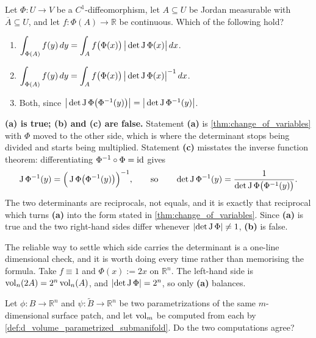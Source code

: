 \begin{question}
\label{q:quiz_q9}
Let $\Phi : U \to V$ be a $C^1$-diffeomorphism, let $A \subseteq U$ be Jordan measurable with
$\overline A \subseteq U$, and let $f : \Phi(A) \to \mathbb{R}$ be continuous. Which of the
following hold?
\begin{enumerate}[label=\textbf{(\alph*)}]
  \item $\displaystyle\int_{\Phi(A)} f(y)\,dy
    = \int_A f\big(\Phi(x)\big)\,\big\lvert\det\operatorname{J}\Phi(x)\big\rvert\,dx$.
  \item $\displaystyle\int_{\Phi(A)} f(y)\,dy
    = \int_A f\big(\Phi(x)\big)\,\big\lvert\det\operatorname{J}\Phi(x)\big\rvert^{-1}\,dx$.
  \item Both, since
    $\big\lvert\det\operatorname{J}\Phi\big(\Phi^{-1}(y)\big)\big\rvert
      = \big\lvert\det\operatorname{J}\Phi^{-1}(y)\big\rvert$.
\end{enumerate}
\end{question}

\begin{answer}
\textbf{(a) is true; (b) and (c) are false.} Statement \textbf{(a)} is
\cref{thm:change_of_variables} with $\Phi$ moved to the other side, which is where the
determinant stops being divided and starts being multiplied. Statement \textbf{(c)} misstates
the inverse function theorem: differentiating $\Phi^{-1}\circ\Phi = \operatorname{id}$ gives
\[\operatorname{J}\Phi^{-1}(y) = \Big(\operatorname{J}\Phi\big(\Phi^{-1}(y)\big)\Big)^{-1},
  \qquad\text{so}\qquad
  \det\operatorname{J}\Phi^{-1}(y) = \frac{1}{\det\operatorname{J}\Phi\big(\Phi^{-1}(y)\big)}.\]
The two determinants are reciprocals, not equals, and it is exactly that reciprocal which turns
\textbf{(a)} into the form stated in \cref{thm:change_of_variables}. Since \textbf{(a)} is true
and the two right-hand sides differ whenever $\lvert\det\operatorname{J}\Phi\rvert \neq 1$, \textbf{(b)} is
false.
\end{answer}

\begin{ainote}
The reliable way to settle which side carries the determinant is a one-line dimensional check,
and it is worth doing every time rather than memorising the formula. Take $f \equiv 1$ and
$\Phi(x) := 2x$ on $\mathbb{R}^n$. The left-hand side is $\operatorname{vol}_n(2A) = 2^n\operatorname{vol}_n(A)$, and
$\lvert\det\operatorname{J}\Phi\rvert = 2^n$, so only \textbf{(a)} balances.
\end{ainote}

\begin{question}
\label{q:quiz_q10}
Let $\phi : B \to \mathbb{R}^n$ and $\psi : \widetilde B \to \mathbb{R}^n$ be two
parametrizations of the same $m$-dimensional surface patch, and let $\operatorname{vol}_m$ be computed from
each by \cref{def:d_volume_parametrized_submanifold}. Do the two computations agree?
\end{question}

